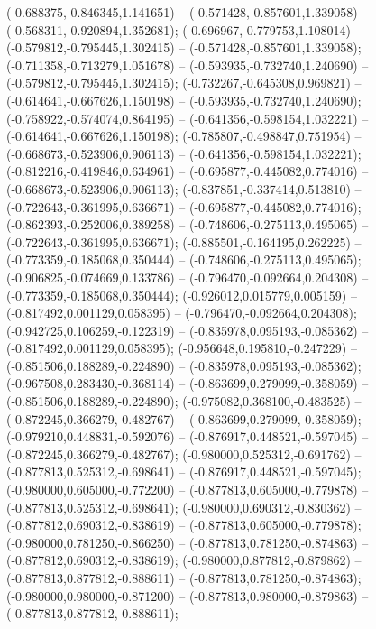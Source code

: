  (-0.688375,-0.846345,1.141651) -- (-0.571428,-0.857601,1.339058) -- (-0.568311,-0.920894,1.352681);
 (-0.696967,-0.779753,1.108014) -- (-0.579812,-0.795445,1.302415) -- (-0.571428,-0.857601,1.339058);
 (-0.711358,-0.713279,1.051678) -- (-0.593935,-0.732740,1.240690) -- (-0.579812,-0.795445,1.302415);
 (-0.732267,-0.645308,0.969821) -- (-0.614641,-0.667626,1.150198) -- (-0.593935,-0.732740,1.240690);
 (-0.758922,-0.574074,0.864195) -- (-0.641356,-0.598154,1.032221) -- (-0.614641,-0.667626,1.150198);
 (-0.785807,-0.498847,0.751954) -- (-0.668673,-0.523906,0.906113) -- (-0.641356,-0.598154,1.032221);
 (-0.812216,-0.419846,0.634961) -- (-0.695877,-0.445082,0.774016) -- (-0.668673,-0.523906,0.906113);
 (-0.837851,-0.337414,0.513810) -- (-0.722643,-0.361995,0.636671) -- (-0.695877,-0.445082,0.774016);
 (-0.862393,-0.252006,0.389258) -- (-0.748606,-0.275113,0.495065) -- (-0.722643,-0.361995,0.636671);
 (-0.885501,-0.164195,0.262225) -- (-0.773359,-0.185068,0.350444) -- (-0.748606,-0.275113,0.495065);
 (-0.906825,-0.074669,0.133786) -- (-0.796470,-0.092664,0.204308) -- (-0.773359,-0.185068,0.350444);
 (-0.926012,0.015779,0.005159) -- (-0.817492,0.001129,0.058395) -- (-0.796470,-0.092664,0.204308);
 (-0.942725,0.106259,-0.122319) -- (-0.835978,0.095193,-0.085362) -- (-0.817492,0.001129,0.058395);
 (-0.956648,0.195810,-0.247229) -- (-0.851506,0.188289,-0.224890) -- (-0.835978,0.095193,-0.085362);
 (-0.967508,0.283430,-0.368114) -- (-0.863699,0.279099,-0.358059) -- (-0.851506,0.188289,-0.224890);
 (-0.975082,0.368100,-0.483525) -- (-0.872245,0.366279,-0.482767) -- (-0.863699,0.279099,-0.358059);
 (-0.979210,0.448831,-0.592076) -- (-0.876917,0.448521,-0.597045) -- (-0.872245,0.366279,-0.482767);
 (-0.980000,0.525312,-0.691762) -- (-0.877813,0.525312,-0.698641) -- (-0.876917,0.448521,-0.597045);
 (-0.980000,0.605000,-0.772200) -- (-0.877813,0.605000,-0.779878) -- (-0.877813,0.525312,-0.698641);
 (-0.980000,0.690312,-0.830362) -- (-0.877812,0.690312,-0.838619) -- (-0.877813,0.605000,-0.779878);
 (-0.980000,0.781250,-0.866250) -- (-0.877813,0.781250,-0.874863) -- (-0.877812,0.690312,-0.838619);
 (-0.980000,0.877812,-0.879862) -- (-0.877813,0.877812,-0.888611) -- (-0.877813,0.781250,-0.874863);
 (-0.980000,0.980000,-0.871200) -- (-0.877813,0.980000,-0.879863) -- (-0.877813,0.877812,-0.888611);
